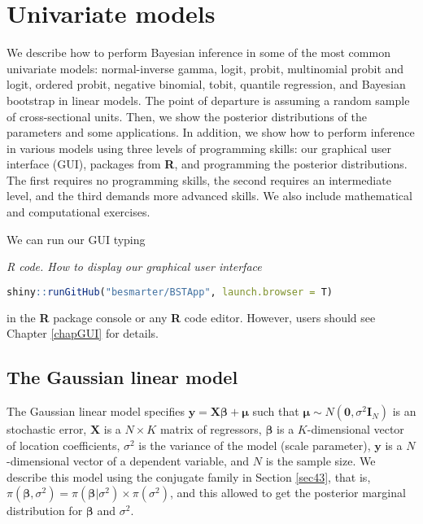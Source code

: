 \chapter{Univariate models}\label{chap6}

We describe how to perform Bayesian inference in some of the most common univariate models: normal-inverse gamma, logit, probit, multinomial probit and logit, ordered probit, negative binomial, tobit, quantile regression, and Bayesian bootstrap in linear models. The point of departure is assuming a random sample of cross-sectional units. Then, we show the posterior distributions of the parameters and some applications. In addition, we show how to perform inference in various models using three levels of programming skills: our graphical user interface (GUI), packages from \textbf{R}, and programming the posterior distributions. The first requires no programming skills, the second requires an intermediate level, and the third demands more advanced skills. We also include mathematical and computational exercises.

We can run our GUI typing

\begin{tcolorbox}[enhanced,width=4.67in,center upper,
	fontupper=\large\bfseries,drop shadow southwest,sharp corners]
	\textit{R code. How to display our graphical user interface}
	\begin{VF}
		\begin{lstlisting}[language=R]
	shiny::runGitHub("besmarter/BSTApp", launch.browser = T)
\end{lstlisting}
	\end{VF}
\end{tcolorbox} 

in the \textbf{R} package console or any \textbf{R} code editor. However, users should see Chapter \ref{chapGUI} for details.

\section{The Gaussian linear model}\label{sec61}

The Gaussian linear model specifies ${\bm{y}}={\bm{X}}\bm{\bm{\beta}}+\bm{\mu}$ such that $\bm{\mu}\sim N(\bm{0},\sigma^2\bm{I}_N)$ is an stochastic error, ${\bm{X}}$ is a $N \times K$ matrix of regressors, $\bm{\bm{\beta}}$ is a $K$-dimensional vector of location coefficients, $\sigma^2$ is the variance of the model (scale parameter), ${\bm{y}}$ is a $N$-dimensional vector of a dependent variable, and $N$ is the sample size. We describe this model using the conjugate family in Section \ref{sec43}, that is, $\pi(\bm{\bm{\beta}},\sigma^2)=\pi(\bm{\bm{\beta}}|\sigma^2)\times\pi(\sigma^2)$, and this allowed to get the posterior marginal distribution for $\bm{\bm{\beta}}$ and $\sigma^2$.

